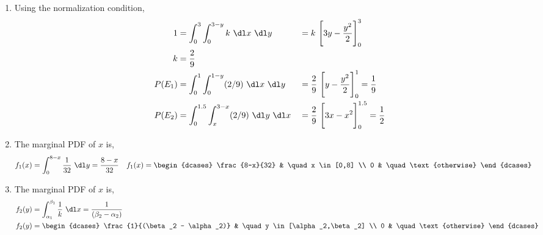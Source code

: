 \begin{enumerate}
    \item Using the normalization condition,
          \begin{align}
              1      & = \int_{0}^{3} \int_{0}^{3-y} k\ \dl x\ \dl y           &
                     & = k\ \Bigg[3y - \frac{y^2}{2}\Bigg]_0^3                   \\
              k      & = \frac{2}{9}                                             \\
              P(E_1) & = \int_{0}^{1} \int_{0}^{1-y} (2/9)\ \dl x\ \dl y       &
                     & = \frac{2}{9}\ \Bigg[ y - \frac{y^2}{2} \Bigg]_0^1
              = \frac{1}{9}                                                      \\
              P(E_2) & = \int_{0}^{1.5} \int_{x}^{3-x} (2/9)\ \dl y\ \dl x     &
                     & = \frac{2}{9}\ \Bigg[3x-x^2\Bigg]_0^{1.5} = \frac{1}{2}
          \end{align}
          \begin{figure}[H]
              \centering
          \end{figure}

    \item The marginal PDF of $ x $ is,
          \begin{align}
              f_1(x) & = \int_{0}^{8-x} \frac{1}{32}\ \dl y = \frac{8-x}{32} &
              f_1(x) & = \begin{dcases}
                             \frac{8-x}{32} & \quad x \in [0,8]      \\
                             0              & \quad \text{otherwise}
                         \end{dcases}
          \end{align}

    \item The marginal PDF of $ x $ is,
          \begin{align}
              f_2(y) & = \int_{\alpha_1}^{\beta_1} \frac{1}{k}\ \dl x
              = \frac{1}{(\beta_2 - \alpha_2)}                        \\
              f_2(y) & = \begin{dcases}
                             \frac{1}{(\beta_2 - \alpha_2)}
                               & \quad y \in [\alpha_2,\beta_2] \\
                             0 & \quad \text{otherwise}
                         \end{dcases}
          \end{align}


\end{enumerate}
